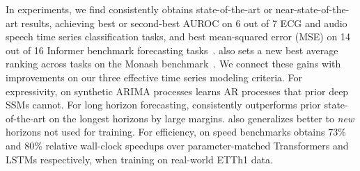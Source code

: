 
In experiments, 
%
we find \ourmethod{} consistently obtains state-of-the-art or near-state-of-the-art results, achieving best or second-best AUROC on 6 out of 7 ECG and audio speech time series classification tasks, and best mean-squared error (MSE) on 14 out of 16 Informer benchmark forecasting tasks~\citep{zhou2021informer}. \ourmethod{} also sets a new best average ranking across \numberMonashTasks{} tasks on the Monash benchmark~\citep{godahewa2021monash}.  
% 
We connect these gains with improvements on our three effective time series modeling criteria.  %
For expressivity, on synthetic ARIMA processes \ourmethod{} learns AR processes that prior deep SSMs cannot. 
%
%
%
For long horizon forecasting, \ourmethod{} consistently outperforms prior state-of-the-art on the longest horizons by large margins. \ourmethod{} also generalizes better to \emph{new} horizons not used for training.
%
%
For efficiency, on speed benchmarks \ourmethod{} obtains 73\% and 80\% relative wall-clock speedups over parameter-matched Transformers and LSTMs respectively, when training on real-world ETTh1 data.
